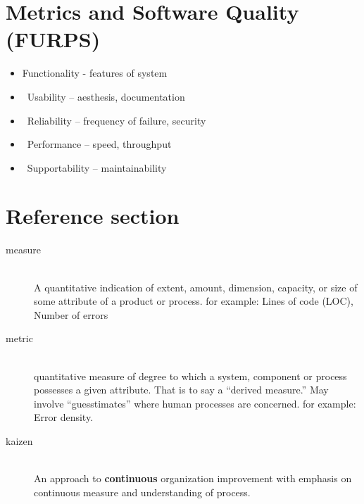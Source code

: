 \documentclass{article}
\begin{document}
\section{Metrics and Software Quality (FURPS)}
\begin{itemize}
  \item Functionality		-	features	of	system	
  \item  Usability	–	aesthesis,	documentation	
  \item  Reliability	–	frequency	of	failure,	security	
  \item  Performance	–	speed,	throughput	
  \item  Supportability	–	maintainability

\end{itemize}

\pagebreak

\section*{Reference section} \label{sec:reference}
\begin{description}
	\item[measure] \hfill \\ A quantitative indication of extent, amount, dimension, capacity, or size of some attribute of a product or process. for example: Lines of code (LOC), Number of errors
	\item[metric] \hfill \\ quantitative measure of degree to which a system, component or process possesses a given attribute. That is to say a “derived measure.” May involve “guesstimates” where human processes are concerned. for example: Error density.
	\item[kaizen] \hfill \\ An approach to \textbf{continuous} organization improvement with emphasis on continuous measure and understanding of process.
\end{description}
\end{document}
